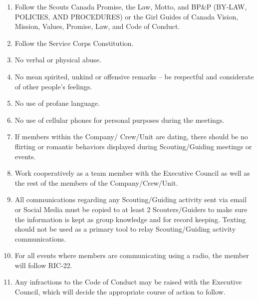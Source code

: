 \documentclass{Service_Corps_Document}
\begin{document}
\def \Title {Code of Conduct}
\def \Company {Service Corps}
\def \versionNumber {3.0}
\stdFooter
\begin{titlepage}
	\stdTitlePage
\end{titlepage}
\begin{enumerate}
	\item Follow the Scouts Canada Promise, the Law, Motto, and BP\&P (BY-LAW, POLICIES, AND PROCEDURES) or the Girl Guides 	of Canada Vision, Mission, Values, Promise, Law, and Code of Conduct.
	\item Follow the Service Corps Constitution.
	\item No verbal or physical abuse.
	\item No mean spirited, unkind or offensive remarks – be respectful and considerate of other people’s feelings.
	\item No use of profane language.
	\item No use of cellular phones for personal purposes during the meetings.
	\item If members within the Company/ Crew/Unit are dating, there should be no flirting or romantic behaviors displayed during Scouting/Guiding meetings or events.
	\item Work cooperatively as a team member with the Executive Council as well as the rest of the members of the Company/Crew/Unit.
	\item All communications regarding any Scouting/Guiding activity sent via email or Social Media must be copied to at least 2 Scouters/Guiders to make sure the information is kept as group knowledge and for record keeping. Texting should not be used as a primary tool to relay Scouting/Guiding activity communications.
	\item For all events where members are communicating using a radio, the member will follow RIC-22.
	\item Any infractions to the Code of Conduct may be raised with the Executive Council, which will decide the appropriate course of action to follow.
	      		
\end{enumerate}
\end{document}

